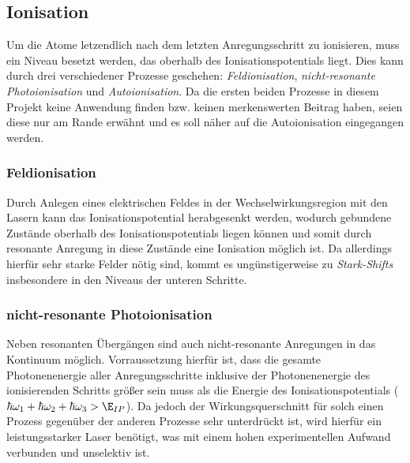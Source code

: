 \subsection{Ionisation}\label{subsec:ionisation}
Um die Atome letzendlich nach dem letzten Anregungsschritt zu ionisieren, muss
ein Niveau besetzt werden, das oberhalb des Ionisationspotentials liegt. Dies
kann durch drei verschiedener Prozesse geschehen: \textit{Feldionisation},
\textit{nicht-resonante Photoionisation} und \textit{Autoionisation}. Da die
ersten beiden Prozesse in diesem Projekt keine Anwendung finden bzw.
keinen merkenswerten Beitrag haben, seien diese nur am Rande erwähnt und es soll
näher auf die Autoionisation eingegangen werden.

\subsubsection{Feldionisation}\label{subsubsec:feldionisation}
Durch Anlegen eines elektrischen Feldes in der Wechselwirkungsregion mit den
Lasern kann das Ionisationspotential herabgesenkt werden, wodurch gebundene
Zustände oberhalb des Ionisationspotentials liegen können und somit durch
resonante Anregung in diese Zustände eine Ionisation möglich ist. Da allerdings
hierfür sehr starke Felder nötig sind, kommt es ungünstigerweise zu
\textit{Stark-Shifts} insbesondere in den Niveaus der unteren Schritte.

\subsubsection{nicht-resonante
Photoionisation}\label{subsubsec:nicht-resonante_photoionisation}
Neben resonanten Übergängen sind auch nicht-resonante Anregungen in das
Kontinuum möglich. Vorraussetzung hierfür ist, dass die gesamte Photonenenergie
aller Anregungsschritte inklusive der Photonenenergie des ionisierenden Schritts
größer sein muss als die Energie des Ionisationspotentials
($\hbar\omega_1+\hbar\omega_2+\hbar\omega_3>\E_{IP}$). Da jedoch der
Wirkungsquerschnitt für solch einen Prozess gegenüber der anderen Prozesse
sehr unterdrückt ist, wird hierfür ein leistungsstarker Laser
benötigt, was mit einem hohen experimentellen Aufwand verbunden und unselektiv
ist.

